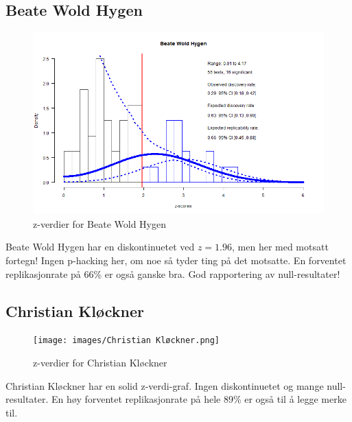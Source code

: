 \documentclass[doc,norsk]{apa7}
\begin{document}
\subsection{Beate Wold Hygen}
\begin{figure}[h!]
    \centering
    \includegraphics[width=\textwidth]{images/Beate Wold Hygen.png}
    \caption{z-verdier for Beate Wold Hygen}
\end{figure}
Beate Wold Hygen har en diskontinuetet ved $z=1.96$, men her med motsatt fortegn! Ingen p-hacking her, om noe så tyder ting på det motsatte. En forventet replikasjonrate på 66\% er også ganske bra. God rapportering av null-resultater! 

\subsection{Christian Kløckner}
\begin{figure}[h!]
    \centering
    \texttt{[image: images/Christian Kløckner.png]}
    \caption{z-verdier for Christian Kløckner}
\end{figure}
Christian Kløckner har en solid z-verdi-graf. Ingen diskontinuetet og mange null-resultater. En høy forventet replikasjonrate på hele 89\% er også til å legge merke til.
\end{document}
